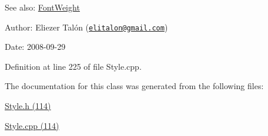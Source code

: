\begin{Desc}
\item[See also:]\hyperlink{_font_weight_8h_ecff23ba4a68486421bcea57e095fe66}{FontWeight}\end{Desc}
\begin{Desc}
\item[Author:]Eliezer Talón (\href{mailto:elitalon@gmail.com}{\tt elitalon@gmail.com}) \end{Desc}
\begin{Desc}
\item[Date:]2008-09-29 \end{Desc}


Definition at line 225 of file Style.cpp.

The documentation for this class was generated from the following files:\begin{CompactItemize}
\item 
\hyperlink{_style_8h}{Style.h (114)}\item 
\hyperlink{_style_8cpp}{Style.cpp (114)}\end{CompactItemize}
